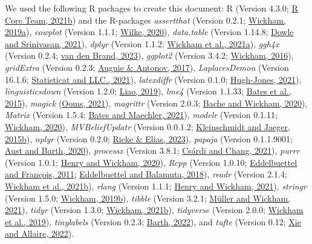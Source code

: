 \documentclass[utf8]{frontiers_suppmat} %
\begin{document}
We used the following R packages to create this document: R (Version 4.3.0; \protect\hyperlink{ref-R-base}{R Core Team, 2021b}) and the R-packages \emph{assertthat} (Version 0.2.1; \protect\hyperlink{ref-R-assertthat}{Wickham, 2019a}), \emph{cowplot} (Version 1.1.1; \protect\hyperlink{ref-R-cowplot}{Wilke, 2020}), \emph{data.table} (Version 1.14.8; \protect\hyperlink{ref-R-data.table}{Dowle and Srinivasan, 2021}), \emph{dplyr} (Version 1.1.2; \protect\hyperlink{ref-R-dplyr}{Wickham et al., 2021a}), \emph{ggh4x} (Version 0.2.4; \protect\hyperlink{ref-R-ggh4x}{van den Brand, 2023}), \emph{ggplot2} (Version 3.4.2; \protect\hyperlink{ref-R-ggplot2}{Wickham, 2016}), \emph{gridExtra} (Version 0.2.3; \protect\hyperlink{ref-R-gridExtra}{Auguie & Antonov, 2017}), \emph{LaplacesDemon} (Version 16.1.6; \protect\hyperlink{ref-R-LaplacesDemon}{Statisticat and LLC., 2021}), \emph{latexdiffr} (Version 0.1.0; \protect\hyperlink{ref-R-latexdiffr}{Hugh-Jones, 2021}), \emph{linguisticsdown} (Version 1.2.0; \protect\hyperlink{ref-R-linguisticsdown}{Liao, 2019}), \emph{lme4} (Version 1.1.33; \protect\hyperlink{ref-R-lme4}{Bates et al., 2015}), \emph{magick} (\protect\hyperlink{ref-R-magick}{Ooms, 2021}), \emph{magrittr} (Version 2.0.3; \protect\hyperlink{ref-R-magrittr}{Bache and Wickham, 2020}), \emph{Matrix} (Version 1.5.4; \protect\hyperlink{ref-R-Matrix}{Bates and Maechler, 2021}), \emph{modelr} (Version 0.1.11; \protect\hyperlink{ref-R-modelr}{Wickham, 2020}), \emph{MVBeliefUpdatr} (Version 0.0.1.2; \protect\hyperlink{ref-R-MVBeliefUpdatr}{Kleinschmidt and Jaeger, 2015b}), \emph{nplyr} (Version 0.2.0; \protect\hyperlink{ref-R-nplyr}{Rieke & Elias, 2023}), \emph{papaja} (Version 0.1.1.9001; \protect\hyperlink{ref-R-papaja}{Aust and Barth, 2020}), \emph{processx} (Version 3.8.1; \protect\hyperlink{ref-R-processx}{Csárdi and Chang, 2021}), \emph{purrr} (Version 1.0.1; \protect\hyperlink{ref-R-purrr}{Henry and Wickham, 2020}), \emph{Rcpp} (Version 1.0.10; \protect\hyperlink{ref-R-Rcpp_a}{Eddelbuettel and François, 2011}; \protect\hyperlink{ref-R-Rcpp_b}{Eddelbuettel and Balamuta, 2018}), \emph{readr} (Version 2.1.4; \protect\hyperlink{ref-R-readr}{Wickham et al., 2021b}), \emph{rlang} (Version 1.1.1; \protect\hyperlink{ref-R-rlang}{Henry and Wickham, 2021}), \emph{stringr} (Version 1.5.0; \protect\hyperlink{ref-R-stringr}{Wickham, 2019b}), \emph{tibble} (Version 3.2.1; \protect\hyperlink{ref-R-tibble}{Müller and Wickham, 2021}), \emph{tidyr} (Version 1.3.0; \protect\hyperlink{ref-R-tidyr}{Wickham, 2021b}), \emph{tidyverse} (Version 2.0.0; \protect\hyperlink{ref-R-tidyverse}{Wickham et al., 2019}), \emph{tinylabels} (Version 0.2.3; \protect\hyperlink{ref-R-tinylabels}{Barth, 2022}), and \emph{tufte} (Version 0.12; \protect\hyperlink{ref-R-tufte}{Xie and Allaire, 2022}).
\end{document}

